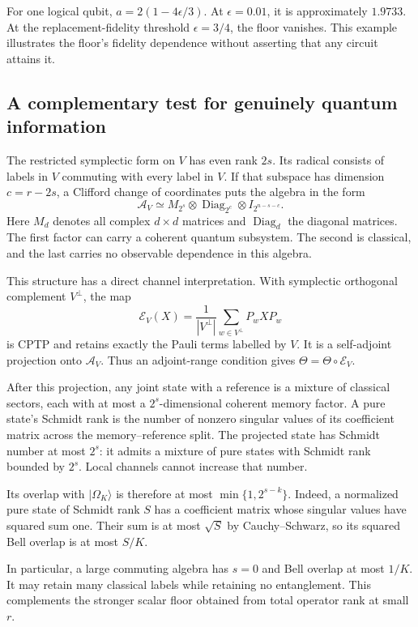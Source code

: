 \documentclass[11pt,a4paper]{article}
\numberwithin{equation}{section}
\theoremstyle{remark}\newtheorem*{remark}{Interpretation}
\newcommand{\A}{\mathcal A}
\newcommand{\eps}{\epsilon}
\newcommand{\ket}[1]{\lvert#1\rangle}
\begin{document}
For one logical qubit, $a=2(1-4\eps/3)$. At $\eps=0.01$, it is approximately $1.9733$. At the replacement-fidelity threshold $\eps=3/4$, the floor vanishes. This example illustrates the floor's fidelity dependence without asserting that any circuit attains it.

\subsection{A complementary test for genuinely quantum information}
The restricted symplectic form on $V$ has even rank $2s$. Its radical consists of labels in $V$ commuting with every label in $V$. If that subspace has dimension $c=r-2s$, a Clifford change of coordinates puts the algebra in the form
\begin{equation}
\A_V\simeq M_{2^s}\otimes\operatorname{Diag}_{2^c}
\otimes I_{2^{n-s-c}}.
\end{equation}
Here $M_d$ denotes all complex $d\times d$ matrices and $\operatorname{Diag}_d$ the diagonal matrices. The first factor can carry a coherent quantum subsystem. The second is classical, and the last carries no observable dependence in this algebra.

This structure has a direct channel interpretation. With symplectic orthogonal complement $V^\perp$, the map
\begin{equation}
\mathcal E_V(X)=\frac1{|V^\perp|}\sum_{w\in V^\perp}P_wXP_w
\end{equation}
is CPTP and retains exactly the Pauli terms labelled by $V$. It is a self-adjoint projection onto $\A_V$. Thus an adjoint-range condition gives $\Theta=\Theta\circ\mathcal E_V$.

After this projection, any joint state with a reference is a mixture of classical sectors, each with at most a $2^s$-dimensional coherent memory factor. A pure state's Schmidt rank is the number of nonzero singular values of its coefficient matrix across the memory--reference split. The projected state has Schmidt number at most $2^s$: it admits a mixture of pure states with Schmidt rank bounded by $2^s$. Local channels cannot increase that number.

Its overlap with $\ket{\Omega_K}$ is therefore at most $\min\{1,2^{s-k}\}$. Indeed, a normalized pure state of Schmidt rank $S$ has a coefficient matrix whose singular values have squared sum one. Their sum is at most $\sqrt S$ by Cauchy--Schwarz, so its squared Bell overlap is at most $S/K$.

In particular, a large commuting algebra has $s=0$ and Bell overlap at most $1/K$. It may retain many classical labels while retaining no entanglement. This complements the stronger scalar floor obtained from total operator rank at small $r$.
\end{document}
